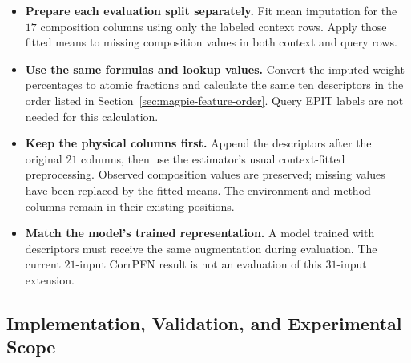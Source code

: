 \documentclass[11pt]{article}
\newenvironment{notes}
  {\begin{itemize}\setlength{\itemsep}{0.45em}\setlength{\parsep}{0pt}}
  {\end{itemize}}
\begin{document}
\begin{notes}
    \item \textbf{Prepare each evaluation split separately.}
    Fit mean imputation for the \(17\) composition columns
    using only the labeled context rows.
    Apply those fitted means to missing composition values
    in both context and query rows.

    \item \textbf{Use the same formulas and lookup values.}
    Convert the imputed weight percentages to atomic
    fractions and calculate the same ten descriptors
    in the order listed in
    Section~\ref{sec:magpie-feature-order}.
    Query EPIT labels are not needed for this calculation.

    \item \textbf{Keep the physical columns first.}
    Append the descriptors after the original \(21\)
    columns, then use the estimator's usual context-fitted
    preprocessing.
    Observed composition values are preserved; missing
    values have been replaced by the fitted means.
    The environment and method columns remain in their
    existing positions.

    \item \textbf{Match the model's trained representation.}
    A model trained with descriptors must receive the same
    augmentation during evaluation.
    The current \(21\)-input CorrPFN result is not an
    evaluation of this \(31\)-input extension.
\end{notes}

\subsection{Implementation, Validation, and Experimental Scope}
\label{sec:magpie-implementation}
\end{document}
